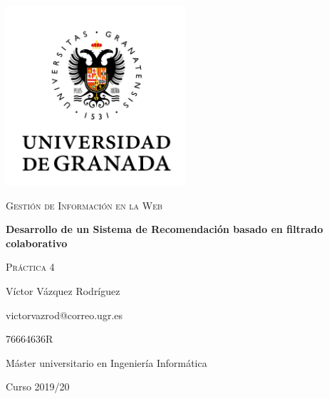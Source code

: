 \documentclass{article}
\begin{document}
\begin{titlepage}
  \centering
  \includegraphics[width=0.5\textwidth]{images/logo-ugr.png}\par
  \vspace{1cm}
  {\Large\scshape Gestión de Información en la Web \par}
  {\huge\bfseries Desarrollo de un Sistema de Recomendación basado en filtrado
  colaborativo \par}
  \vspace{0.2cm}
  {\scshape Práctica 4 \par}
  \vfill
  {\large Víctor Vázquez Rodríguez  \par}
  {victorvazrod@correo.ugr.es \par}
  {76664636R \par}
  \vfill
  {\large Máster universitario en Ingeniería Informática \par}
  \vspace{0.2cm}
  {Curso 2019/20 \par}
\end{titlepage}

\tableofcontents\newpage

\newpage
\newpage
\newpage
\newpage
\end{document}
